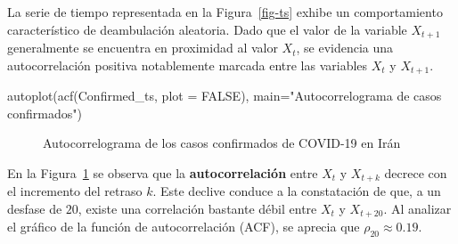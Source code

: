 \documentclass[
  letterpaper,
  DIV=11,
  numbers=noendperiod]{scrreport}
\newenvironment{Shaded}{\begin{snugshade}}{\end{snugshade}}
\newcommand{\AttributeTok}[1]{\textcolor[rgb]{0.40,0.45,0.13}{#1}}
\newcommand{\ConstantTok}[1]{\textcolor[rgb]{0.56,0.35,0.01}{#1}}
\newcommand{\FunctionTok}[1]{\textcolor[rgb]{0.28,0.35,0.67}{#1}}
\newcommand{\NormalTok}[1]{\textcolor[rgb]{0.00,0.23,0.31}{#1}}
\newcommand{\StringTok}[1]{\textcolor[rgb]{0.13,0.47,0.30}{#1}}
\theoremstyle{plain}
\theoremstyle{definition}
\theoremstyle{definition}
\theoremstyle{plain}
\theoremstyle{remark}
\begin{document}
La serie de tiempo representada en la Figura~\ref{fig-ts} exhibe un
comportamiento característico de deambulación aleatoria. Dado que el
valor de la variable \(X_{t+1}\) generalmente se encuentra en proximidad
al valor \(X_t\), se evidencia una autocorrelación positiva notablemente
marcada entre las variables \(X_t\) y \(X_{t+1}\).

\begin{Shaded}
\begin{Highlighting}[]
\FunctionTok{autoplot}\NormalTok{(}\FunctionTok{acf}\NormalTok{(Confirmed\_ts, }\AttributeTok{plot =} \ConstantTok{FALSE}\NormalTok{), }
         \AttributeTok{main=}\StringTok{"Autocorrelograma de casos confirmados"}\NormalTok{)}
\end{Highlighting}
\end{Shaded}

\begin{figure}


\caption{\label{fig-acf}Autocorrelograma de los casos confirmados de
COVID-19 en Irán}

\end{figure}%

En la Figura~\ref{fig-acf} se observa que la \textbf{autocorrelación}
entre \(X_t\) y \(X_{t+k}\) decrece con el incremento del retraso \(k\).
Este declive conduce a la constatación de que, a un desfase de \(20\),
existe una correlación bastante débil entre \(X_t\) y \(X_{t+20}\). Al
analizar el gráfico de la función de autocorrelación (ACF), se aprecia
que \(\rho_{20}\approx 0.19\).
\end{document}
